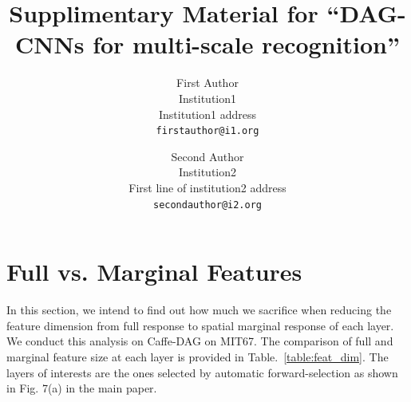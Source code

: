 \documentclass[10pt,twocolumn,letterpaper]{article}
\begin{document}
\title{Supplimentary Material for ``DAG-CNNs for multi-scale recognition''}

\author{First Author\\
Institution1\\
Institution1 address\\
{\tt\small firstauthor@i1.org}
\and
Second Author\\
Institution2\\
First line of institution2 address\\
{\tt\small secondauthor@i2.org}
}

\maketitle

%

\section{Full vs. Marginal Features}

In this section, we intend to find out how much we sacrifice when reducing the feature dimension from full response to spatial marginal response of each layer. We conduct this analysis on Caffe-DAG on MIT67. The comparison of full and marginal feature size at each layer is provided in Table.~\ref{table:feat_dim}. The layers of interests are the ones selected by automatic forward-selection as shown in Fig. 7(a) in the main paper. 
\end{document}

